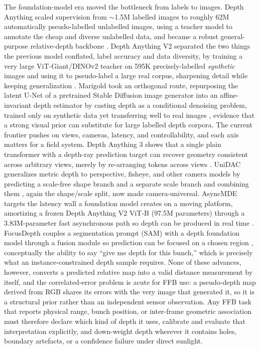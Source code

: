 The foundation-model era moved the bottleneck from labels to images. Depth Anything scaled supervision from $\sim$1.5M labelled images to roughly 62M automatically pseudo-labelled unlabelled images, using a teacher model to annotate the cheap and diverse unlabelled data, and became a robust general-purpose relative-depth backbone \cite{yang2024depthanything}. Depth Anything V2 separated the two things the previous model conflated, label accuracy and data diversity, by training a very large ViT-Giant/DINOv2 teacher on 595K precisely-labelled \emph{synthetic} images and using it to pseudo-label a large real corpus, sharpening detail while keeping generalization \cite{yang2024depthanythingv2}. Marigold took an orthogonal route, repurposing the latent U-Net of a pretrained Stable Diffusion image generator into an affine-invariant depth estimator by casting depth as a conditional denoising problem, trained only on synthetic data yet transferring well to real images \cite{ke2024marigold}, evidence that a strong visual prior can substitute for large labelled depth corpora. The current frontier pushes on views, cameras, latency, and controllability, and each axis matters for a field system. Depth Anything 3 shows that a single plain transformer with a depth-ray prediction target can recover geometry consistent across arbitrary views, merely by re-arranging tokens across views \cite{lin2025depthanything3}. UniDAC generalizes metric depth to perspective, fisheye, and other camera models by predicting a scale-free shape branch and a separate scale branch and combining them \cite{ganesan2026unidac}, again the shape/scale split, now made camera-universal. AsyncMDE targets the latency wall a foundation model creates on a moving platform, amortizing a frozen Depth Anything V2 ViT-B (97.5M parameters) through a 3.83M-parameter fast asynchronous path so depth can be produced in real time \cite{ma2026asyncmde}. FocusDepth couples a segmentation prompt (SAM) with a depth foundation model through a fusion module so prediction can be focused on a chosen region \cite{du2026focusabledepth}, conceptually the ability to say ``give me depth for this bunch,'' which is precisely what an instance-constrained depth sample requires. None of these advances, however, converts a predicted relative map into a valid distance measurement by itself, and the correlated-error problem is acute for FFB use: a pseudo-depth map derived from RGB shares its errors with the very image that generated it, so it is a structural prior rather than an independent sensor observation. Any FFB task that reports physical range, bunch position, or inter-frame geometric association must therefore declare which kind of depth it uses, calibrate and evaluate that interpretation explicitly, and down-weight depth wherever it contains holes, boundary artefacts, or a confidence failure under direct sunlight.


